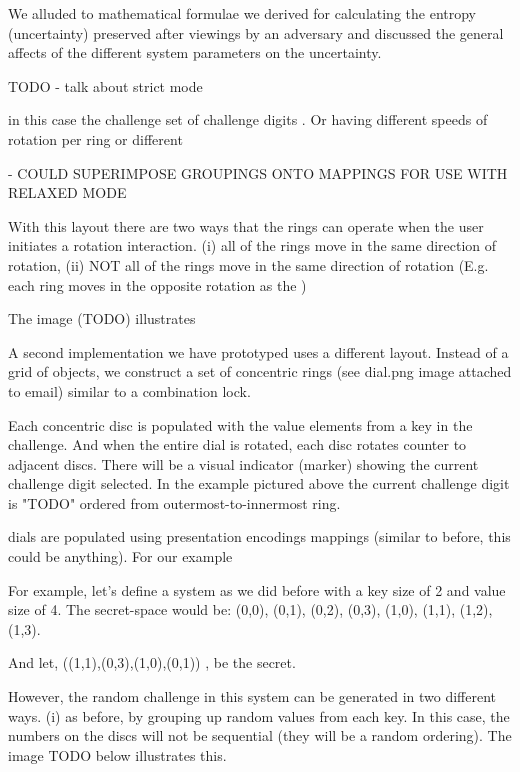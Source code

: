 \documentclass[12pt]{document}
\begin{document}
\begin{Introduction}
We alluded to mathematical formulae we derived for calculating the entropy (uncertainty) preserved after viewings by an adversary and discussed the general affects of the different system parameters on the uncertainty.








TODO - talk about strict mode

in this case the challenge  set of challenge digits . Or having different speeds of rotation per ring or different




- COULD SUPERIMPOSE GROUPINGS ONTO MAPPINGS FOR USE WITH RELAXED MODE



With this layout there are two ways that the rings can operate when the user initiates a rotation interaction.
(i) all of the rings move in the same direction of rotation,
(ii) NOT all of the rings move in the same direction of rotation (E.g. each ring moves in the opposite rotation as the )

The image (TODO) illustrates 

A second implementation we have prototyped uses a different layout. Instead of a grid of objects, we construct a set of concentric rings (see dial.png image attached to email) similar to a combination lock.



Each concentric disc is populated with the value elements from a key in the challenge.
And when the entire dial is rotated, each disc rotates counter to adjacent discs.
There will be a visual indicator (marker) showing the current challenge digit selected. 
In the example pictured above the current challenge digit is "TODO" ordered from outermost-to-innermost ring.



dials are populated using presentation encodings mappings (similar to before, this could be anything). For our example


For example, let's define a system as we did before with a key size of 2 and value size of 4. 
The secret-space would be:
  (0,0), (0,1), (0,2), (0,3),
  (1,0), (1,1), (1,2), (1,3).

And let,
  ((1,1),(0,3),(1,0),(0,1))
, be the secret.

However, the random challenge in this system can be generated in two different ways.
  (i) as before, by grouping up random values from each key.
    In this case, the numbers on the discs will not be sequential (they will be a random ordering).
    The image TODO below illustrates this.


\end{Introduction}
\end{document}
